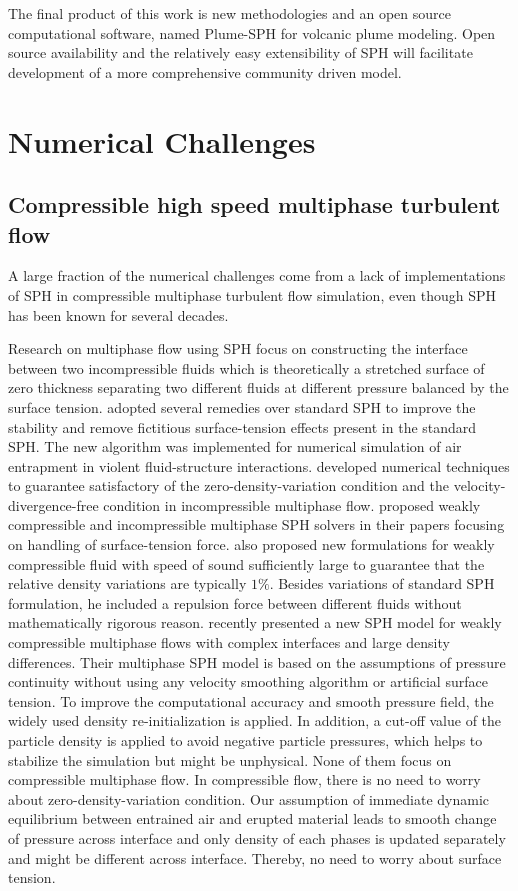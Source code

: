 The final product of this work is new methodologies and an open source computational software, named Plume-SPH for volcanic plume modeling. Open source availability and the relatively easy extensibility of SPH will facilitate development of a more comprehensive community driven model.

\section{Numerical Challenges}

\subsection{Compressible high speed multiphase turbulent flow}
\label{sec:Compressible-high-speed-multiphase-turbulent-flow}
A large fraction of the numerical challenges come from a lack of implementations of SPH in compressible multiphase turbulent flow simulation, even though SPH has been known for several decades.

Research on multiphase flow using SPH focus on constructing the interface between two incompressible fluids which is theoretically a stretched surface of zero thickness  separating two different fluids at different pressure balanced by the surface tension.
\citet{colagrossi2003numerical} adopted several remedies over standard SPH to improve the stability and remove fictitious surface-tension effects present in the standard SPH. The new algorithm was implemented for numerical simulation of air entrapment in violent fluid-structure interactions. \citet{hu2007incompressible} developed numerical techniques to guarantee satisfactory of the zero-density-variation condition and the velocity-divergence-free condition in incompressible multiphase flow. \citet{adami2010new} proposed weakly compressible and incompressible multiphase SPH solvers in their papers focusing on handling of surface-tension force. \citet{monaghan2013simple} also proposed new formulations for weakly compressible fluid with speed of sound sufficiently large to guarantee that the relative density variations are typically $1\%$. Besides variations of standard SPH formulation, he included a repulsion force between different fluids without mathematically rigorous reason. \citet {chen2015sph} recently presented a new SPH model for weakly compressible multiphase flows with complex interfaces and large density differences. Their multiphase SPH model is based on the assumptions of pressure continuity without using any velocity smoothing algorithm or artificial surface tension. To improve the computational accuracy and smooth pressure field, the widely used density re-initialization is applied. In addition, a cut-off value of the particle density is applied to avoid negative particle pressures, which helps to stabilize the simulation but might be unphysical. None of them focus on compressible multiphase flow.
In compressible flow, there is no need to worry about zero-density-variation condition. Our assumption of immediate dynamic equilibrium between entrained air and erupted material leads to smooth change of pressure across interface and  only density of each phases is updated separately and might be different across interface. Thereby, no need to worry about surface tension.
 
